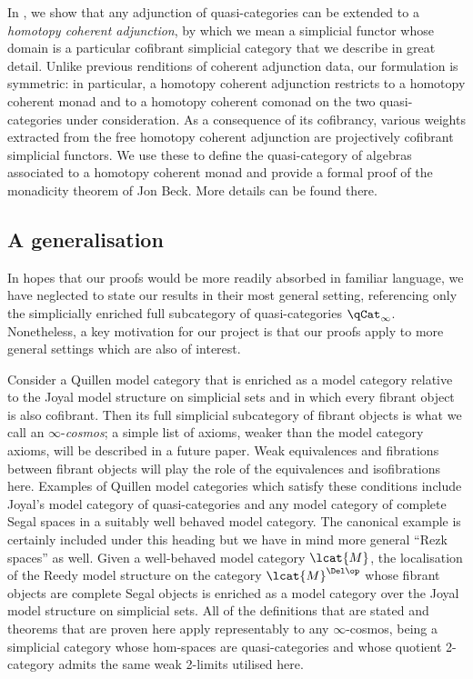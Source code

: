 In \cite{RiehlVerity:2012hc}, we show that any adjunction of quasi-categories can be extended to a {\em homotopy coherent adjunction}, by which we mean a simplicial functor whose domain is a particular cofibrant simplicial category that we describe in great detail. Unlike previous renditions of coherent adjunction data, our formulation is symmetric: in particular, a homotopy coherent adjunction restricts to a homotopy coherent monad and to a homotopy coherent comonad on the two quasi-categories under consideration. As a consequence of its cofibrancy, various weights extracted from the free homotopy coherent adjunction are projectively cofibrant simplicial functors. We use these to define the quasi-category of algebras associated to a homotopy coherent monad and provide a formal proof of the monadicity theorem of Jon Beck. More details can be found there.

\subsection{A generalisation}

In hopes that our proofs would be  more readily absorbed in familiar language, we have neglected to state our results in their most general setting, referencing only the simplicially enriched full subcategory of quasi-categories $\qCat_\infty$. Nonetheless, a key motivation for our project is that our proofs apply to more general settings which are also of interest.  

Consider a Quillen model category that is enriched as a model category relative to the Joyal model structure on simplicial sets and in which every fibrant object is also cofibrant. Then its full simplicial subcategory of fibrant objects is what we call an $\infty$-\emph{cosmos}; a simple list of axioms, weaker than the model category axioms, will be described in a future paper. Weak equivalences and fibrations between fibrant objects will play the role of the equivalences and isofibrations here. Examples of Quillen model categories which satisfy these conditions include Joyal's model category of quasi-categories and any model category of complete Segal spaces in a suitably well behaved model category. The canonical example \cite{Joyal:2007kk,Rezk:2001sf} is certainly included under this heading but we have in mind more general ``Rezk spaces'' as well. Given a well-behaved model category $\lcat{M}$, the localisation of the Reedy model structure on the category $\lcat{M}^{\Del\op}$ whose fibrant objects are complete Segal objects is enriched as a model category over the Joyal model structure on simplicial sets. All of the definitions that are stated and theorems that are proven here apply representably to any $\infty$-cosmos, being a simplicial category whose hom-spaces are quasi-categories and whose quotient 2-category admits the same weak 2-limits utilised here.


